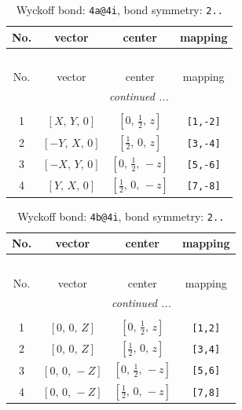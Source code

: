 \documentclass[fleqn,8pt]{jsarticle}
\begin{document}
\begin{longtable}{cccc}
\caption{Wyckoff bond: {\tt 4a@4i}, bond symmetry: {\tt 2..}}
 \\
 \hline \hline
No. & vector & center & mapping \\ \hline \endfirsthead

\multicolumn{3}{l}{\tablename\ \thetable{}} \\
 \hline \hline
No. & vector & center & mapping \\ \hline \endhead

 \hline \hline
\multicolumn{3}{r}{\footnotesize\it continued ...} \\ \endfoot

 \hline \hline
\multicolumn{3}{r}{} \\ \endlastfoot

1 & $\left[ X,\, Y,\, 0 \right]$ & $\left[ 0,\, \frac{1}{2},\, z \right]$ & {\tt [1,-2]} \\ \hline
2 & $\left[ - Y,\, X,\, 0 \right]$ & $\left[ \frac{1}{2},\, 0,\, z \right]$ & {\tt [3,-4]} \\ \hline
3 & $\left[ - X,\, Y,\, 0 \right]$ & $\left[ 0,\, \frac{1}{2},\, - z \right]$ & {\tt [5,-6]} \\ \hline
4 & $\left[ Y,\, X,\, 0 \right]$ & $\left[ \frac{1}{2},\, 0,\, - z \right]$ & {\tt [7,-8]} \\
\end{longtable}
\renewcommand{\arraystretch}{1.2}
\begin{longtable}{cccc}
\caption{Wyckoff bond: {\tt 4b@4i}, bond symmetry: {\tt 2..}}
 \\
 \hline \hline
No. & vector & center & mapping \\ \hline \endfirsthead

\multicolumn{3}{l}{\tablename\ \thetable{}} \\
 \hline \hline
No. & vector & center & mapping \\ \hline \endhead

 \hline \hline
\multicolumn{3}{r}{\footnotesize\it continued ...} \\ \endfoot

 \hline \hline
\multicolumn{3}{r}{} \\ \endlastfoot

1 & $\left[ 0,\, 0,\, Z \right]$ & $\left[ 0,\, \frac{1}{2},\, z \right]$ & {\tt [1,2]} \\ \hline
2 & $\left[ 0,\, 0,\, Z \right]$ & $\left[ \frac{1}{2},\, 0,\, z \right]$ & {\tt [3,4]} \\ \hline
3 & $\left[ 0,\, 0,\, - Z \right]$ & $\left[ 0,\, \frac{1}{2},\, - z \right]$ & {\tt [5,6]} \\ \hline
4 & $\left[ 0,\, 0,\, - Z \right]$ & $\left[ \frac{1}{2},\, 0,\, - z \right]$ & {\tt [7,8]} \\
\end{longtable}
\end{document}
